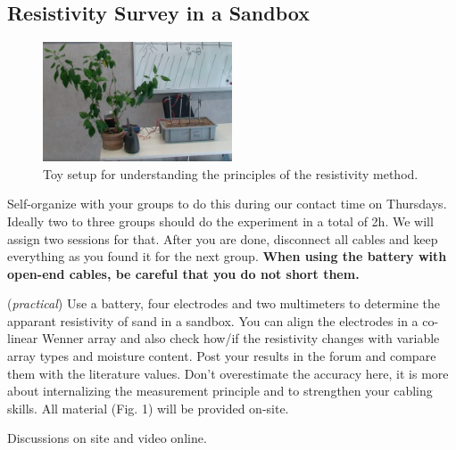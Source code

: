\subsection{Resistivity Survey in a Sandbox}
\begin{figure}[th]
    \centering
    \includegraphics*[width=0.5\textwidth]{Figures/Resistivity/Sandbox.png}
    \caption{Toy setup for understanding the principles of the resistivity method.}
\end{figure}
\begin{tcolorbox}[enhanced jigsaw,breakable,pad at break*=1mm,
    colback=blue!5!white,colframe=burgundy,title=Group Work,
    watermark color=white]
    Self-organize with your groups to do this during our contact time on Thursdays. Ideally two to three groups should do the experiment in a total of 2h. We will assign two sessions for that. After you are done, disconnect all cables and keep everything as you found it for the next group. \textbf{When using the battery with open-end cables, be careful that you do not short them.}
\end{tcolorbox}
(\textit{practical}) Use a battery, four electrodes and two multimeters to determine the apparant resistivity of sand in a sandbox. You can align the electrodes in a co-linear Wenner array and also check how/if the resistivity changes with variable array types and moisture content. Post your results in the forum and compare them with  the literature values. Don't overestimate the accuracy here, it is more about internalizing the measurement principle and to strengthen your cabling skills.  All material (Fig. 1) will be provided on-site. 

\ifanswers
    \begin{tcolorbox}[enhanced jigsaw,breakable,pad at break*=1mm,
    colback=blue!5!white,colframe=babyblueeyes,title=Solutions,
    watermark color=white]
    Discussions on site and video online.
    \end{tcolorbox}
\fi
